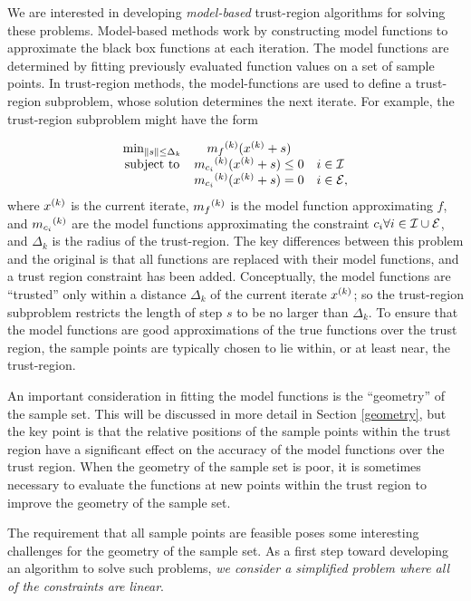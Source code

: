 We are interested in developing {\em model-based} trust-region algorithms for solving these problems.
Model-based methods work by constructing model functions to approximate the black box functions at each iteration.
The model functions are determined by fitting previously evaluated function values on a set of sample points.
In trust-region methods, the model-functions are used to define a trust-region subproblem, whose solution determines the next iterate.
For example, the trust-region subproblem might have the form

\[ \begin{array}{ccl} \min_{\| s \| \le \Delta_k}
 & {{m}_f}^{(k)} ({x}^{(k)}+s) \\
\mbox{subject to} & {{m}_{c_i}}^{(k)}({x}^{(k)} + s) \le 0 & i \in \mathcal{I} \\
& {{m}_{c_i}}^{(k)}({x}^{(k)} + s) = 0 & i \in \mathcal{E},
\end{array}
\]
where ${x}^{(k)}$ is the current iterate, ${{m}_f}^{(k)}$ is the model function approximating $f$,  and ${{m}_{c_i}}^{(k)}$ are the model functions approximating the constraint $c_i \forall i \in \mathcal{I} \cup \mathcal{E}$, and $\Delta_k$ is the radius of the trust-region.
The key differences between this problem and the original is that all functions are replaced with their model functions, and a trust region constraint has been added.
Conceptually, the model functions are ``trusted'' only within a distance $\Delta_k$ of the current iterate ${x}^{(k)}$; so the trust-region subproblem restricts the length of step $s$ to be no larger than $\Delta_k$.
To ensure that the model functions are good approximations of the true functions over the trust region, the sample points are typically chosen to lie within, or at least near, the trust-region.


An important consideration in fitting the model functions is the ``geometry'' of the sample set.
This will be discussed in more detail in Section \cref{geometry}, but the key point is that the relative positions of the sample points within the trust region have a significant effect on the accuracy of the model functions over the trust region.
When the geometry of the sample set is poor, it is sometimes necessary to evaluate the functions at new points within the trust region to improve the geometry of the sample set.

The requirement that all sample points are feasible poses some interesting challenges for the geometry of the sample set.
As a first step toward developing an algorithm to solve such problems, \emph{we consider a simplified problem where all of the constraints are linear}.

